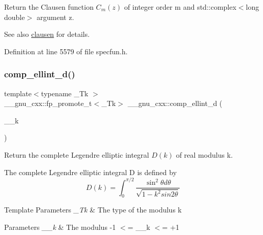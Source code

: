 Return the Clausen function $ C_m(z) $ of integer order {\ttfamily m} and {\ttfamily std\+::complex$<$long double$>$} argument {\ttfamily z}.

\begin{DoxySeeAlso}{See also}
\hyperlink{group__mathsf__gnu_ga54e4ba71b1f81718d6998349f91ff88f}{clausen} for details. 
\end{DoxySeeAlso}


Definition at line 5579 of file specfun.\+h.

\mbox{\label{group__mathsf__gnu_ga3fe79a91524b43ffc5ffb83c0eb2bd00}} 
\subsubsection{\texorpdfstring{comp\+\_\+ellint\+\_\+d()}{comp\_ellint\_d()}}
{\footnotesize\ttfamily template$<$typename \+\_\+\+Tk $>$ \\
\+\_\+\+\_\+gnu\+\_\+cxx\+::fp\+\_\+promote\+\_\+t$<$\+\_\+\+Tk$>$ \+\_\+\+\_\+gnu\+\_\+cxx\+::comp\+\_\+ellint\+\_\+d (\begin{DoxyParamCaption}\item[{\+\_\+\+Tk}]{\+\_\+\+\_\+k }\end{DoxyParamCaption})\hspace{0.3cm}{\ttfamily [inline]}}

Return the complete Legendre elliptic integral $ D(k) $ of real modulus {\ttfamily k}.

The complete Legendre elliptic integral D is defined by \[ D(k) = \int_0^{\pi/2} \frac{\sin^2\theta d\theta}{\sqrt{1-k^2sin2\theta}} \]


\begin{DoxyTemplParams}{Template Parameters}
{\em \+\_\+\+Tk} & The type of the modulus {\ttfamily k} \\
\hline
\end{DoxyTemplParams}

\begin{DoxyParams}{Parameters}
{\em \+\_\+\+\_\+k} & The modulus {\ttfamily -\/1 $<$= \+\_\+\+\_\+k $<$= +1} \\
\hline
\end{DoxyParams}


